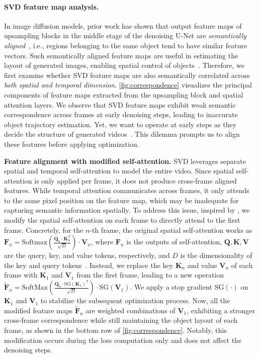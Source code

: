 \documentclass{article} \usepackage{iclr2025_conference,times}
\begin{document}
\paragraph{SVD feature map analysis.} 
In image diffusion models, prior work has shown that output feature maps of upsampling blocks in the middle stage of the denoising U-Net are \textit{semantically aligned}~\citep{tang2023emergent, namekata2024emerdiff, hedlin2024unsupervised, zhang2023tale, luo2023dhf}, i.e., regions belonging to the same object tend to have similar feature vectors. Such semantically aligned feature maps are useful in estimating the layout of generated images, enabling spatial control of objects~\citep{shi2024dragdiffusion, mou2023dragondiffusion}.
Therefore, we first examine whether SVD feature maps are also semantically correlated across \textit{both spatial and temporal dimension}. \cref{fig:correspondence} visualizes the principal components of feature maps extracted from the upsampling block and spatial attention layers.
We observe that SVD feature maps exhibit weak semantic correspondence across frames at early denoising steps, leading to inaccurate object trajectory estimation.
Yet, we want to operate at early steps as they decide the structure of generated videos~\citep{materzynska2023customizing}.
This dilemma prompts us to align these features before applying optimization.

\textbf{Feature alignment with modified self-attention.} 
SVD leverages separate spatial and temporal self-attention to model the entire video.
Since spatial self-attention is only applied per frame, it does not produce cross-frame aligned features.
While temporal attention communicates across frames, it only attends to the same pixel position on the feature map, which may be inadequate for capturing semantic information spatially. To address this issue, inspired by \citep{Tune-a-video}, we modify the spatial self-attention on each frame to directly attend to the first frame.
Concretely, for the $n$-th frame, the original spatial self-attention works as $\bm{F}_n = 
\mathrm{Softmax}(\frac{\bm{Q}_{n} \cdot \bm{K}_{n}^T}{\sqrt{D}})\cdot \bm{V}_{n}$, where $\bm{F}_n$ is the outputs of self-attention, $\bm{Q}, \bm{K}, \bm{V}$ are the query, key, and value tokens, respectively, and $D$ is the dimensionality of the key and query tokens~\cite{Transformer}.
Instead, we replace the key $\bm{K}_{n}$ and value $\bm{V}_{n}$ of each frame with $\bm{K}_{1}$ and $\bm{V}_{1}$ from the first frame, leading to a new operation $\tilde{\bm{F}}_n = 
\mathrm{SoftMax}(\frac{\bm{Q}_{n} \cdot \mathrm{SG}(\bm{K}_{1})^T}{\sqrt{D}}) \cdot \mathrm{SG}(\bm{V}_{1})$.
We apply a stop gradient $\mathrm{SG}(\cdot)$ on $\bm{K}_{1}$ and $\bm{V}_{1}$ to stabilize the subsequent optimization process.
Now, all the modified feature maps $\tilde{\bm{F}}_n$ are weighted combinations of $\bm{V}_1$, exhibiting a stronger cross-frame correspondence while still maintaining the object layout of each frame, as shown in the bottom row of \cref{fig:correspondence}. Notably, this modification occurs during the loss computation only and does not affect the denoising steps.
\end{document}
